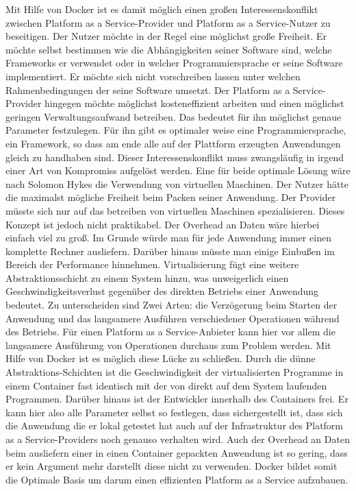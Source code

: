 Mit Hilfe von Docker ist es damit möglich einen großen Interessenskonflikt zwischen Platform as a Service-Provider und Platform as a Service-Nutzer zu beseitigen.
Der Nutzer möchte in der Regel eine möglichst große Freiheit. Er möchte selbst bestimmen wie die Abhängigkeiten seiner Software sind, welche Frameworks er verwendet oder in welcher Programmiersprache er seine Software implementiert. Er möchte sich nicht vorschreiben lassen unter welchen Rahmenbedingungen der seine Software umsetzt. Der Platform as a Service-Provider hingegen möchte möglichst kosteneffizient arbeiten und einen möglichst geringen Verwaltungsaufwand betreiben. Das bedeutet für ihn möglichst genaue Parameter festzulegen. Für ihn gibt es optimaler weise eine Programmiersprache, ein Framework, so dass am ende alle auf der Plattform erzeugten Anwendungen gleich zu handhaben sind. Dieser Interessenskonflikt muss zwangsläufig in irgend einer Art von Kompromiss aufgelöst werden.
Eine für beide optimale Lösung wäre nach Solomon Hykes \cite[Zeit 13:50]{hykes_introduction_2013} die Verwendung von virtuellen Maschinen. Der Nutzer hätte die maximalst mögliche Freiheit beim Packen seiner Anwendung. Der Provider müsste sich nur auf das betreiben von virtuellen Maschinen spezialisieren. Dieses Konzept ist jedoch nicht praktikabel. Der Overhead an Daten wäre hierbei einfach viel zu groß. Im Grunde würde man für jede Anwendung immer einen komplette Rechner ausliefern. Darüber hinaus müsste man einige Einbußen im Bereich der Performance hinnehmen.
\glqq Virtualisierung fügt eine weitere Abstraktionsschicht zu einem System hinzu, was unweigerlich einen Geschwindigkeitsverlust gegenüber des direkten Betriebs einer Anwendung bedeutet. Zu unterscheiden sind Zwei Arten: die Verzögerung beim Starten der Anwendung und das langsamere Ausführen verschiedener Operationen während des Betriebs.\grqq \cite[Seite 4]{schroder_container-virtualisierung_2014}
Für einen Platform as a Service-Anbieter kann hier vor allem die langsamere Ausführung von Operationen durchaus zum Problem werden.
Mit Hilfe von Docker ist es möglich diese Lücke zu schließen. Durch die dünne Abstraktions-Schichten ist die Geschwindigkeit der virtualisierten Programme in einem Container fast identisch mit der von direkt auf dem System laufenden Programmen.\cite{schroder_container-virtualisierung_2014} Darüber hinaus ist der Entwickler innerhalb des Containers frei. Er kann hier also alle Parameter selbst so festlegen, dass sichergestellt ist, dass sich die Anwendung die er lokal getestet hat auch auf der Infrastruktur des Platform as a Service-Providers noch genauso verhalten wird. Auch der Overhead an Daten beim ausliefern einer in einen Container gepackten Anwendung ist so gering, dass er kein Argument mehr darstellt diese nicht zu verwenden.
Docker bildet somit die Optimale Basis um darum einen effizienten Platform as a Service aufzubauen. 

